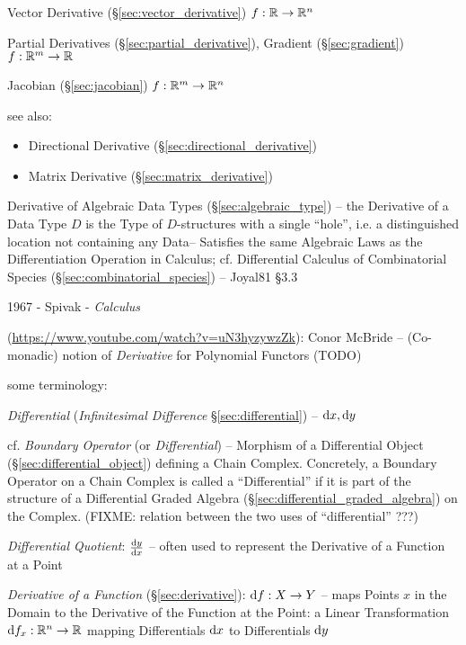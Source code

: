 Vector Derivative (\S\ref{sec:vector_derivative})
$f : \mathbb{R} \rightarrow \mathbb{R}^n$

Partial Derivatives (\S\ref{sec:partial_derivative}), Gradient
(\S\ref{sec:gradient}) $f : \mathbb{R}^m \rightarrow \mathbb{R}$

Jacobian (\S\ref{sec:jacobian}) $f : \mathbb{R}^m \rightarrow \mathbb{R}^n$

see also:

\begin{itemize}
  \item Directional Derivative (\S\ref{sec:directional_derivative})
  \item Matrix Derivative (\S\ref{sec:matrix_derivative})
\end{itemize}

\fist Derivative of Algebraic Data Types (\S\ref{sec:algebraic_type}) -- the
Derivative of a Data Type $D$ is the Type of $D$-structures with a single
``hole'', i.e. a distinguished location not containing any Data-- Satisfies the
same Algebraic Laws as the Differentiation Operation in Calculus;
cf. Differential Calculus of Combinatorial Species
(\S\ref{sec:combinatorial_species}) -- Joyal81 \S3.3

1967 - Spivak - \emph{Calculus}

(\url{https://www.youtube.com/watch?v=uN3hyzywzZk}): Conor McBride --
(Co-monadic) notion of \emph{Derivative} for Polynomial Functors (TODO)

some terminology:

\emph{Differential} (\emph{Infinitesimal Difference} \S\ref{sec:differential})
-- $\mathrm{d}x, \mathrm{d}y$

\fist cf. \emph{Boundary Operator} (or \emph{Differential}) -- Morphism of a
Differential Object (\S\ref{sec:differential_object}) defining a Chain Complex.
Concretely, a Boundary Operator on a Chain Complex is called a ``Differential''
if it is part of the structure of a Differential Graded Algebra
(\S\ref{sec:differential_graded_algebra}) on the Complex.
(FIXME: relation between the two uses of ``differential'' ???)

\emph{Differential Quotient}: $\frac{\mathrm{d}y}{\mathrm{d}x}$ -- often used to represent the
Derivative of a Function at a Point

\emph{Derivative of a Function} (\S\ref{sec:derivative}): $\mathrm{d}f : X
\rightarrow Y$ -- maps Points $x$ in the Domain to the Derivative of the
Function at the Point: a Linear Transformation
$\mathrm{d}f_x : \mathbb{R}^n \rightarrow \mathbb{R}$ mapping Differentials $\mathrm{d}x$ to
Differentials $\mathrm{d}y$

